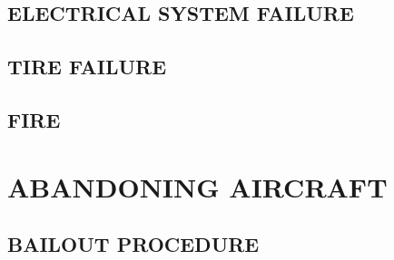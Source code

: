 \subsection{ELECTRICAL SYSTEM FAILURE}
\subsection{TIRE FAILURE}
\subsection{FIRE}


\section{ABANDONING AIRCRAFT}
\subsection{BAILOUT PROCEDURE}


\cleardoublepage